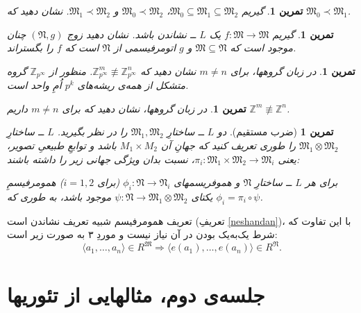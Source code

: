 \documentclass[12pt,a4paper]{report}
\theoremstyle{colorhead}
\newtheorem{tam}[thm]{تمرین}
\begin{document}
\begin{tam}

گیریم 
$\mathfrak{M}_0\subseteq \mathfrak{M}_1\subseteq \mathfrak{M}_2$،
$\mathfrak{M}_0\prec \mathfrak{M}_2$
و
$\mathfrak{M}_1\prec \mathfrak{M}_2$.
نشان دهید که
$\mathfrak{M}_0\prec \mathfrak{M}_1$.
\end{tam}
\begin{tam}
گیریم
$f:\mathfrak{M}\to \mathfrak{M}$
یک 
$L$ ــ
نشاندن باشد. نشان دهید 
زوج 
$(\mathfrak{N},g)$
چنان موجود است که
$\mathfrak{M}\subseteq \mathfrak{N}$
و
$g$
اتومرفیسمی از
$\mathfrak{N}$
است که
$f$
را بگستراند.
\end{tam}

\begin{tam}
در زبان گروهها،
برای
$m\not=n$
نشان دهید که
$\mathbb{Z}^m_{p^\infty }\not\equiv \mathbb{Z}^n_{p^\infty }$.
منظور از
$\mathbb{Z}_{p^\infty }$
گروه متشکل از همه‌ی ریشه‌های
$p^k$
اُمِ واحد است.
\end{tam}
\begin{tam}
در زبان گروهها، نشان دهید که برای
$m\not=n$
داریم
$\mathbb{Z}^m\not\equiv\mathbb{Z}^n$.
\end{tam}
\begin{tam}[ضرب مستقیم]
دو
$L$ ــ
ساختارِ
$\mathfrak{M}_1,\mathfrak{M}_2$
را در نظر بگیرید. 
$L$
ــ ساختارِ
$\mathfrak{M}_1\otimes \mathfrak{M}_2$
را طوری تعریف کنید که جهانِ آن
$M_1\times M_2$
باشد و توابعِ طبیعیِ تصویر، یعنی
$\pi_i:\mathfrak{M}_1\times \mathfrak{M}_2\to \mathfrak{M}_i$،
نسبت بدان
ویژگی جهانی زیر را داشته باشند:
\par 
برای هر
$L$ ــ
ساختارِ
$\mathfrak{N}$
و هموفریسمهای
$\phi_i:\mathfrak{N}\to \mathfrak{N}_i$
(برای
$i=1,2$)
همومرفیسمِ یکتای
$\psi:\mathfrak{N}\to \mathfrak{M}_1\otimes \mathfrak{M}_2$
موجود باشد، به طوری که
$\phi_i=\pi_i\circ \psi$.
\end{tam}
تعریف همومرفیسم شبیه تعریف نشاندن است (تعریفِ
\ref{neshandan})،‌
 با این تفاوت که شرط یک‌به‌یک بودن در آن نیاز نیست و 
موردِ ۳ به صورت زیر است: 
\[
\langle a_1,\ldots,a_n\rangle\in R^\mathfrak{M} \Rightarrow 
\langle e(a_1),\ldots,e(a_n)\rangle\in R^\mathfrak{N}.
\]
\pagebreak
\section{ جلسه‌ی دوم، مثالهایی از تئوریها}
\end{document}
